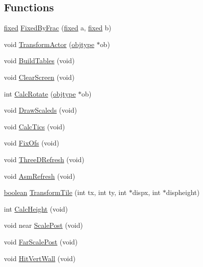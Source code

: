 \subsection*{Functions}
\begin{DoxyCompactItemize}
\item 
\hyperlink{WL__DEF_8H_aaf54715c9b83afe8794059fcf5fd5e7e}{fixed} \hyperlink{WL__DRAW_8C_ac58e6db60be1fcbd21351db5a7ca8210}{FixedByFrac} (\hyperlink{WL__DEF_8H_aaf54715c9b83afe8794059fcf5fd5e7e}{fixed} a, \hyperlink{WL__DEF_8H_aaf54715c9b83afe8794059fcf5fd5e7e}{fixed} b)
\item 
void \hyperlink{WL__DRAW_8C_a356d3c2c5bc5099f87ed2bb02e140214}{TransformActor} (\hyperlink{structobjstruct}{objtype} $\ast$ob)
\item 
void \hyperlink{WL__DRAW_8C_aebfb7b9493a691dd53697b23e3189822}{BuildTables} (void)
\item 
void \hyperlink{WL__DRAW_8C_a5473c6cfd6c580642133754e141ca556}{ClearScreen} (void)
\item 
int \hyperlink{WL__DRAW_8C_a3a99a69629692f4c3650d6897b8a50be}{CalcRotate} (\hyperlink{structobjstruct}{objtype} $\ast$ob)
\item 
void \hyperlink{WL__DRAW_8C_a3f31beef974ac9e631c4b634d91ba701}{DrawScaleds} (void)
\item 
void \hyperlink{WL__DRAW_8C_af0ec8fc59f12a59ce2ed1c270150bdb0}{CalcTics} (void)
\item 
void \hyperlink{WL__DRAW_8C_a31ead32276ab38dbf2991c82ee38ea7c}{FixOfs} (void)
\item 
void \hyperlink{WL__DRAW_8C_abde2aab3bb185f39bd50f4574444a034}{ThreeDRefresh} (void)
\item 
void \hyperlink{WL__DRAW_8C_ae6c27c874bfdde1b2fdd875acd7a46bb}{AsmRefresh} (void)
\item 
\hyperlink{ID__HEAD_8H_a7c6368b321bd9acd0149b030bb8275ed}{boolean} \hyperlink{WL__DRAW_8C_a8dd01549377ec258fb992ce693af0f73}{TransformTile} (int tx, int ty, int $\ast$dispx, int $\ast$dispheight)
\item 
int \hyperlink{WL__DRAW_8C_a386bf088b4f96442d53c07b827beac72}{CalcHeight} (void)
\item 
void near \hyperlink{WL__DRAW_8C_a4b208186aca19498e93d05a0c44d775e}{ScalePost} (void)
\item 
void \hyperlink{WL__DRAW_8C_aeee237495a97abc0d12cd405446ac92b}{FarScalePost} (void)
\item 
void \hyperlink{WL__DRAW_8C_ad2e8beb940ef03b1bbb0672123ededaf}{HitVertWall} (void)
\item 

\end{DoxyCompactItemize}
